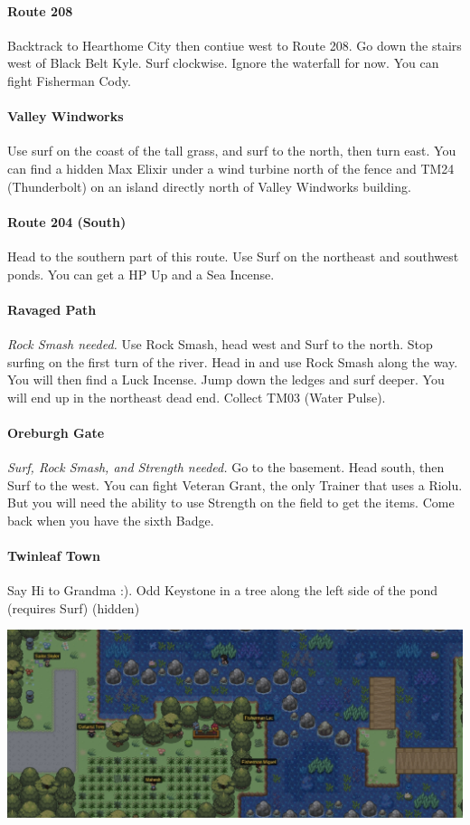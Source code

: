 \documentclass[11pt]{article}
\begin{document}
\paragraph{Route 208}
Backtrack to Hearthome City then contiue west to Route 208.
Go down the stairs west of Black Belt Kyle.
Surf clockwise.
Ignore the waterfall for now.
You can fight Fisherman Cody.

\paragraph{Valley Windworks}
Use surf on the coast of the tall grass, and surf to the north, then turn east.
You can find a hidden Max Elixir under a wind turbine north of the fence and
TM24 (Thunderbolt) on an island directly north of Valley Windworks building.

\paragraph{Route 204 (South)}
Head to the southern part of this route.
Use Surf on the northeast and southwest ponds.
You can get a HP Up and a Sea Incense.

\paragraph{Ravaged Path} \emph{Rock Smash needed.}
Use Rock Smash, head west and Surf to the north.
Stop surfing on the first turn of the river.
Head in and use Rock Smash along the way.
You will then find a Luck Incense.
Jump down the ledges and surf deeper.
You will end up in the northeast dead end.
Collect TM03 (Water Pulse).

\paragraph{Oreburgh Gate}
\emph{Surf, Rock Smash, and Strength needed.}
Go to the basement.
Head south, then Surf to the west.
You can fight Veteran Grant, the only Trainer that uses a Riolu.
But you will need the ability to use Strength on the field to get the items.
Come back when you have the sixth Badge.

\paragraph{Twinleaf Town}
Say Hi to Grandma :).
Odd Keystone in a tree along the left side of the pond (requires Surf) (hidden)

\includegraphics[width=\textwidth]{walkthrough/Sinnoh/Route_218}
\end{document}
